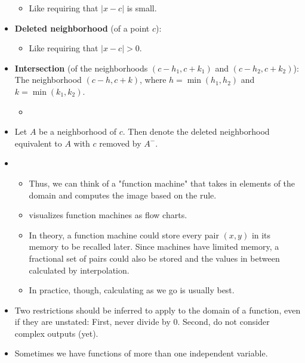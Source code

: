 \documentclass[../main.tex]{subfiles}
\begin{document}
\begin{itemize}
    \begin{itemize}
        \item Like requiring that $|x-c|$ is small.
    \end{itemize}
    \item \textbf{Deleted neighborhood} (of a point $c$): 
    \begin{itemize}
        \item Like requiring that $|x-c|>0$.
    \end{itemize}
    \item \textbf{Intersection} (of the neighborhoods $(c-h_1,c+k_1)$ and $(c-h_2,c+k_2)$): The neighborhood $(c-h,c+k)$, where $h=\min(h_1,h_2)$ and $k=\min(k_1,k_2)$.
    \begin{itemize}
        \item {}
    \end{itemize}
    \item Let $A$ be a neighborhood of $c$. Then denote the deleted neighborhood equivalent to $A$ with $c$ removed by $A^-$.
    \item {}
    \begin{itemize}
        \item Thus, we can think of a "function machine" that takes in elements of the domain and computes the image based on the rule.
        \item \cite{bib:Thomas} visualizes function machines as flow charts.
        \item In theory, a function machine could store every pair $(x,y)$ in its memory to be recalled later. Since machines have limited memory, a fractional set of pairs could also be stored and the values in between calculated by interpolation.
        \item In practice, though, calculating as we go is usually best.
    \end{itemize}
    \item Two restrictions should be inferred to apply to the domain of a function, even if they are unstated: First, never divide by 0. Second, do not consider complex outputs (yet).
    \item Sometimes we have functions of more than one independent variable.

\end{itemize}
\end{document}
